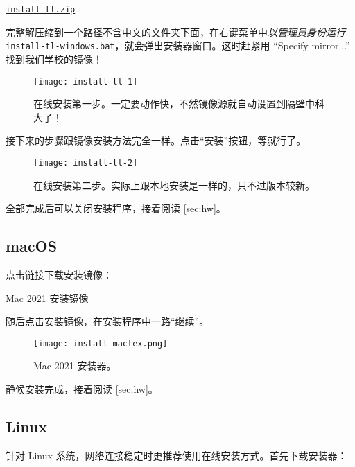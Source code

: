 \medskip
\href{https://mirrors.nju.edu.cn/CTAN/systems/texlive/tlnet/install-tl.zip}{\faFile*[regular] \texttt{install-tl.zip}}
\medskip

完整解压缩到一个路径不含中文的文件夹下面，在右键菜单中\emph{以管理员身份运行} \texttt{install-tl-windows.bat}，就会弹出安装器窗口。这时赶紧用 “Specify mirror...” 找到我们学校的镜像！

\begin{figure}[htbp]
  \texttt{[image: install-tl-1]}
  \caption{在线安装第一步。一定要动作快，不然镜像源就自动设置到隔壁中科大了！}
\end{figure}

\begin{widepar}
接下来的步骤跟镜像安装方法完全一样。点击“安装”按钮，等就行了。
\end{widepar}

\begin{figure}[htbp]
  \texttt{[image: install-tl-2]}
  \caption{在线安装第二步。实际上跟本地安装是一样的，只不过版本较新。}
\end{figure}

全部完成后可以关闭安装程序，接着阅读 \ref{sec:hw}。

\subsection{macOS}
\label{subsec:tl-mac}

点击链接下载安装镜像：

\medskip
\href{https://mirrors.nju.edu.cn/CTAN/systems/mac/mactex/mactex-20210328.pkg}{\faFile*[regular] Mac 2021 安装镜像}
\medskip

随后点击安装镜像，在安装程序中一路“继续”。

\begin{figure}[htbp]
  \caption{Mac 2021 安装器。}
  \label{fig:install-mactex}
  \texttt{[image: install-mactex.png]}
\end{figure}

静候安装完成，接着阅读 \ref{sec:hw}。

\subsection{Linux}
\label{subsec:tl-linux}

针对 Linux 系统，网络连接稳定时更推荐使用在线安装方式。首先下载安装器：

